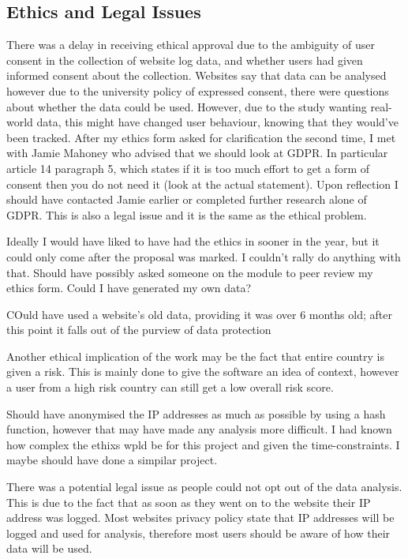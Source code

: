 \subsection{Ethics and Legal Issues}
There was a delay in receiving ethical approval due to the ambiguity of user consent in the collection of website log data, and whether users had given informed consent about the collection. Websites say that data can be analysed however due to the university policy of expressed consent, there were questions about whether the data could be used. However, due to the study wanting real-world data, this might have changed user behaviour, knowing that they would've been tracked. After my ethics form asked for clarification the second time, I met with Jamie Mahoney who advised that we should look at GDPR. In particular article 14 paragraph 5, which states if it is too much effort to get a form of consent then you do not need it (look at the actual statement). Upon reflection I should have contacted Jamie earlier or completed further research alone of GDPR. This is also a legal issue and it is the same as the ethical problem.

Ideally I would have liked to have had the ethics in sooner in the year, but it could only come after the proposal was marked. I couldn't rally do anything with that. Should have possibly asked someone on the module to peer review my ethics form. Could I have generated my own data? 

COuld have used a website's old data, providing it was over 6 months old; after this point it falls out of the purview of data protection

Another ethical implication of the work may be the fact that  entire country is given a risk. This is mainly done to give the software an idea of context, however a user from a high risk country can still get a low overall risk score.

Should have anonymised the IP addresses as much as possible by using a hash function, however that may have made any analysis more difficult. I had known how complex the ethixs wpld be for this project and given the time-constraints. I maybe should have done a simpilar project.

There was a potential legal issue as people could not opt out of the data analysis. This is due to the fact that as soon as they went on to the website their IP address was logged. Most websites privacy policy state that IP addresses will be logged and used for analysis, therefore most users should be aware of how their data will be used.